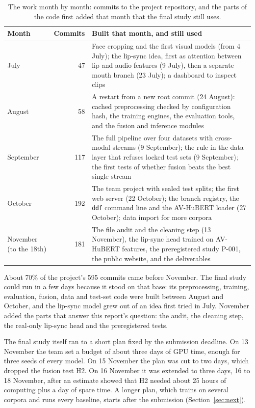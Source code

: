 \begin{table}[ht]
    \centering
    \small
    \caption{The work month by month: commits to the project repository, and the parts of the code first added that month that the final study still uses.}
    \label{tab:months}
    \begin{tabularx}{\textwidth}{@{}l r >{\raggedright\arraybackslash}X@{}}
        \toprule
        \textbf{Month} & \textbf{Commits} & \textbf{Built that month, and still used} \\
        \midrule
        July & 47 & Face cropping and the first visual models (from 4 July); the lip-sync idea, first as attention between lip and audio features (9 July), then a separate mouth branch (23 July); a dashboard to inspect clips \\
        August & 58 & A restart from a new root commit (24 August): cached preprocessing checked by configuration hash, the training engines, the evaluation tools, and the fusion and inference modules \\
        September & 117 & The full pipeline over four datasets with cross-modal streams (9 September); the rule in the data layer that refuses locked test sets (9 September); the first tests of whether fusion beats the best single stream \\
        October & 192 & The team project with sealed test splits; the first web server (22 October); the branch registry, the \texttt{ddf} command line and the AV-HuBERT loader (27 October); data import for more corpora \\
        November (to the 18th) & 181 & The file audit and the cleaning step (13 November), the lip-sync head trained on AV-HuBERT features, the preregistered study P-001, the public website, and the deliverables \\
        \bottomrule
    \end{tabularx}
\end{table}

About 70\% of the project's 595 commits came before November. The final study
could run in a few days because it stood on that base: its preprocessing,
training, evaluation, fusion, data and test-set code were built between August
and October, and the lip-sync model grew out of an idea first tried in July.
November added the parts that answer this report's question: the audit, the
cleaning step, the real-only lip-sync head and the preregistered tests.

The final study itself ran to a short plan fixed by the submission deadline. On 13
November the team set a budget of about three days of GPU time, enough for
three seeds of every model. On 15 November the plan was cut to two days, which
dropped the fusion test H2. On 16 November it was extended to three days,
16 to 18 November, after an estimate showed that H2 needed about 25 hours of
computing plus a day of spare time. A longer plan, which trains on several
corpora and runs every baseline, starts after the submission
(Section~\ref{sec:next}).

